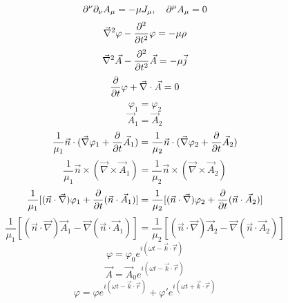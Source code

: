 \begin{equation}
    \partial^{\nu}\partial_{\nu}A_{\mu}=-\mu J_{\mu},\quad
    \partial^{\mu}A_{\mu}=0
\end{equation}
\begin{equation}
    \vec{\nabla}^2\varphi-\frac{\partial^2}{\partial t^2}\varphi=-\mu\rho
\end{equation}
\begin{equation}
    \vec{\nabla}^2\vec{A}-\frac{\partial^2}{\partial t^2}\vec{A}=-\mu\vec{j}
\end{equation}
\begin{equation}
    \frac{\partial}{\partial t}\varphi+\vec{\nabla}\cdot\vec{A}=0
\end{equation}
\begin{equation}
    \varphi_1=\varphi_2
\end{equation}
\begin{equation}
    \vec{A}_1=\vec{A}_2
\end{equation}
\begin{equation}
    \frac{1}{\mu_1}\vec{n}\cdot(\vec{\nabla}\varphi_1+\frac{\partial}{\partial t}\vec{A}_1)=\frac{1}{\mu_2}\vec{n}\cdot(\vec{\nabla}\varphi_2+\frac{\partial}{\partial t}\vec{A}_2)
\end{equation}
\begin{equation}
    \frac{1}{\mu_1}\vec{n}\times(\vec{\nabla}\times\vec{A}_1)=\frac{1}{\mu_2}\vec{n}\times(\vec{\nabla}\times\vec{A}_2)
\end{equation}
\begin{equation}
    \frac{1}{\mu_1}[(\vec{n}\cdot\vec{\nabla})\varphi_1+\frac{\partial}{\partial t}(\vec{n}\cdot\vec{A}_1)]=\frac{1}{\mu_2}[(\vec{n}\cdot\vec{\nabla})\varphi_2+\frac{\partial}{\partial t}(\vec{n}\cdot\vec{A}_2)]
\end{equation}
\begin{equation}
    \frac{1}{\mu_1}[(\vec{n}\cdot\vec{\nabla})\vec{A}_1-\vec{\nabla}(\vec{n}\cdot\vec{A}_1)]=\frac{1}{\mu_2}[(\vec{n}\cdot\vec{\nabla})\vec{A}_2-\vec{\nabla}(\vec{n}\cdot\vec{A}_2)]
\end{equation}
\begin{equation}
    \varphi=\varphi_0e^{i(\omega t-\vec{k}\cdot\vec{r})}
\end{equation}
\begin{equation}
    \vec{A}=\vec{A}_0e^{i(\omega t-\vec{k}\cdot\vec{r})}
\end{equation}
\begin{equation}
    \varphi=\varphi e^{i(\omega t-\vec{k}\cdot\vec{r})}+\varphi' e^{i(\omega t+\vec{k}\cdot\vec{r})}
\end{equation}
